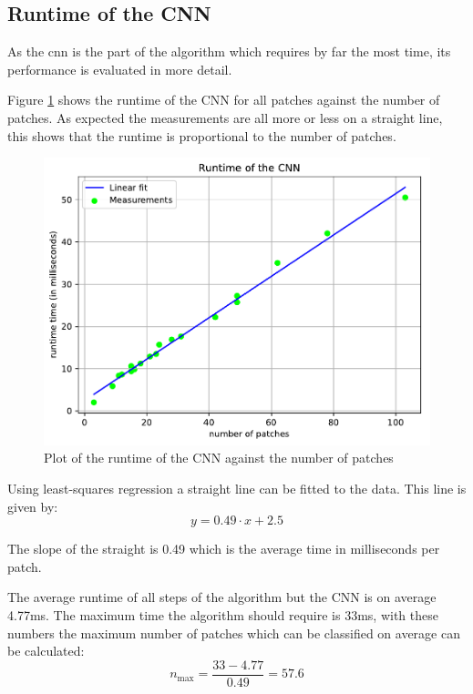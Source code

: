 \subsection{Runtime of the CNN}
As the \ac{cnn} is the part of the algorithm which requires by far the most time, its performance is evaluated in more detail.

Figure \ref{fig:eval:runtime_cnn} shows the runtime of the CNN for all patches against the number of patches. As expected the measurements are all more or less on a straight line, this shows that the runtime is proportional to the number of patches. 

\begin{figure}[h!]
    \centering
    \includegraphics[width=\textwidth]{../Material/runtime_cnn.pdf}
    \caption{Plot of the runtime of the CNN against the number of patches}
    \label{fig:eval:runtime_cnn}
\end{figure}

Using least-squares regression a straight line can be fitted to the data. This line is given by:
\begin{equation}
    y = 0.49 \cdot x + 2.5
\end{equation}

The slope of the straight is 0.49 which is the average time in milliseconds per patch.

The average runtime of all steps of the algorithm but the CNN is on average 4.77ms. 
The maximum time the algorithm should require is 33ms, with these numbers the maximum number of patches which can be classified on average can be calculated:
\begin{equation}
    n_\text{max} = \frac{33 - 4.77}{0.49} = 57.6
\end{equation}

